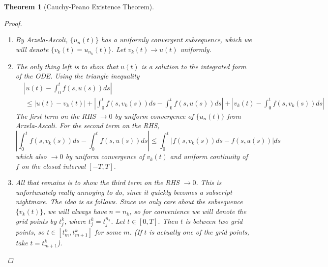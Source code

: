 \documentclass[12pt]{amsart}         %
\newtheorem{theorem}{Theorem}[section]
\theoremstyle{remark}
\begin{document}
\begin{theorem}[Cauchy-Peano Existence Theorem]
\begin{proof}
\begin{enumerate}
    \item By Arzela-Ascoli, $\{u_n(t) \}$ has a uniformly convergent subsequence, which we will denote $\{ v_k(t) = u_{n_k}(t) \}$. Let $v_k(t) \rightarrow u(t)$ uniformly. 
    
    \item The only thing left is to show that $u(t)$ is a solution to the integrated form of the ODE. Using the triangle inequality
    \begin{align*}
    &\left| u(t) - \int_0^t f(s, u(s))ds \right| \\
    &\,\leq |u(t) - v_k(t)| + \left| \int_0^t f(s, v_k(s))ds - \int_0^t f(s, u(s))ds \right| + \left| v_k(t) - \int_0^t f(s, v_k(s))ds \right|
    \end{align*}
    The first term on the RHS $\rightarrow 0$ by uniform convergence of $\{ u_n(t) \}$ from Arzela-Ascoli. For the second term on the RHS,
    \[
    \left| \int_0^t f(s, v_k(s))ds - \int_0^t f(s, u(s))ds \right|  
    \leq \int_0^t | f(s, v_k(s))ds - f(s, u(s))| ds
    \]
    which also $\rightarrow 0$ by uniform convergence of $v_k(t)$ and uniform continuity of $f$ on the closed interval $[-T, T]$.
    
    \item All that remains is to show the third term on the RHS $\rightarrow 0$. This is unfortunately really annoying to do, since it quickly becomes a subscript nightmare. The idea is as follows. Since we only care about the subsequence $\{v_k(t)\}$, we will always have $n = n_k$, so for convenience we will denote the grid points by $t_j^k$, where $t_j^k = t_j^{n_k}$. Let $t \in [0, T]$. Then $t$ is between two grid points, so $t \in [t_m^k, t_{m+1}^k]$ for some $m$. (If $t$ is actually one of the grid points, take $t = t_{m+1}^k$). 
    

\end{enumerate}
\end{proof}
\end{theorem}
\end{document}
